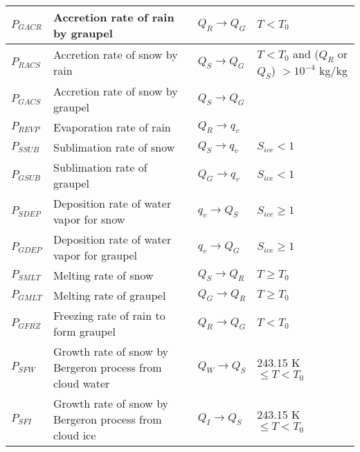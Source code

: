 \begin{table}[tbh]
\begin{center}
{\begin{tabular}{llll}
$P_{GACR}$&Accretion rate of rain by graupel&$Q_{R} \longrightarrow Q_{G}$&$T < T_{0}$ \\ \hline
$P_{RACS}$&Accretion rate of snow by rain&$Q_{S} \longrightarrow Q_{G}$&$T < T_{0}$ and ($Q_{R}$ or $Q_{S}$) $> 10^{-4}$ kg/kg \\ \hline
$P_{GACS}$&Accretion rate of snow by graupel&$Q_{S} \longrightarrow Q_{G}$& \\ \hline
$P_{REVP}$&Evaporation rate of rain&$Q_{R} \longrightarrow q_{v}$& \\ \hline
$P_{SSUB}$&Sublimation rate of snow&$Q_{S} \longrightarrow q_{v}$&$S_{ice} < 1$ \\ \hline
$P_{GSUB}$&Sublimation rate of graupel&$Q_{G} \longrightarrow q_{v}$&$S_{ice} < 1$ \\ \hline
$P_{SDEP}$&Deposition rate of water vapor for snow&$q_{v} \longrightarrow Q_{S}$&$S_{ice} \geq 1$ \\ \hline
$P_{GDEP}$&Deposition rate of water vapor for graupel&$q_{v} \longrightarrow Q_{G}$&$S_{ice} \geq 1$ \\ \hline
$P_{SMLT}$&Melting rate of snow&$Q_{S} \longrightarrow Q_{R}$&$T \geq T_{0}$ \\ \hline
$P_{GMLT}$&Melting rate of graupel&$Q_{G} \longrightarrow Q_{R}$&$T \geq T_{0}$ \\ \hline
$P_{GFRZ}$&Freezing rate of rain to form graupel&$Q_{R} \longrightarrow Q_{G}$&$T < T_{0}$ \\ \hline
$P_{SFW}$&Growth rate of snow by Bergeron process from cloud water&$Q_{W} \longrightarrow Q_{S}$& 243.15 K $\leq T < T_{0}$ \\ \hline
$P_{SFI}$&Growth rate of snow by Bergeron process from cloud ice&$Q_{I} \longrightarrow Q_{S}$& 243.15 K $\leq T < T_{0}$ \\ \hline
\end{tabular}
}
\end{center}
\end{table}

